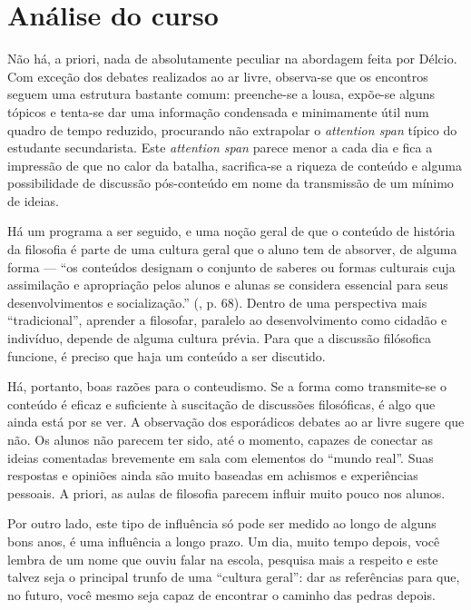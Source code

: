 \documentclass[12pt,a4paper]{article}
\begin{document}
	
	\newpage
		
	\section{Análise do curso}
	
	Não há, a priori, nada de absolutamente peculiar na abordagem feita por 
	Délcio. Com exceção dos debates realizados ao ar livre, observa-se que 
	os encontros seguem uma estrutura bastante comum: preenche-se a lousa, 
	expõe-se alguns tópicos e tenta-se dar uma informação condensada e 
	minimamente útil num quadro de tempo reduzido, procurando não extrapolar 
	o \textit{attention span} típico do estudante secundarista. Este 
	\textit{attention span} parece menor a cada dia e fica a impressão de que 
	no calor da batalha, sacrifica-se a riqueza de conteúdo e alguma 
	possibilidade de discussão pós-conteúdo em nome da transmissão de um 
	mínimo de ideias. 
	
	Há um programa a ser seguido, e uma noção geral de que o conteúdo 
	de história da filosofia é parte de uma cultura geral que o aluno tem de 
	absorver, de alguma forma --- ``os conteúdos designam o conjunto de 
	saberes ou formas culturais cuja assimilação e apropriação pelos alunos e 
	alunas se considera essencial para seus desenvolvimentos e socialização.'' 
	(\cite{obiols}, p. 68). Dentro de uma perspectiva mais ``tradicional'', 
	aprender a filosofar, paralelo ao desenvolvimento como cidadão e 
	indivíduo, depende de alguma cultura prévia. Para que a discussão 
	filósofica funcione, é preciso que haja um conteúdo a ser discutido. 
	
	Há, portanto, boas razões para o conteudismo. Se a forma como transmite-se 
	o conteúdo é eficaz e suficiente à suscitação de discussões filosóficas, é 
	algo que ainda está por se ver. A observação dos esporádicos debates ao ar 
	livre sugere que não. Os alunos não parecem ter sido, até o momento, 
	capazes de conectar as ideias comentadas brevemente em sala com elementos 
	do ``mundo real''. Suas respostas e opiniões ainda são muito baseadas em 
	achismos e experiências pessoais. A priori, as aulas de filosofia parecem 
	influir muito pouco nos alunos. 
	
	Por outro lado, este tipo de influência só pode ser medido ao longo de 
	alguns bons anos, é uma influência a longo prazo. Um dia, muito tempo 
	depois, você lembra de um nome que ouviu falar na escola, pesquisa mais a 
	respeito 	e este talvez seja o principal trunfo de uma 
	``cultura geral'': dar as referências para que, no futuro, você mesmo seja 
	capaz de encontrar o caminho das pedras depois. 
\end{document}
